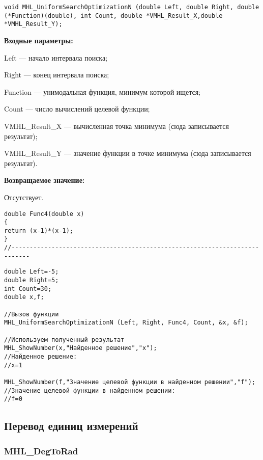 \documentclass[a4paper,12pt]{article}
\begin{document}
\begin{lstlisting}[label=code_syntax_MHL_UniformSearchOptimizationN,caption=Синтаксис]
void MHL_UniformSearchOptimizationN (double Left, double Right, double (*Function)(double), int Count, double *VMHL_Result_X,double *VMHL_Result_Y);
\end{lstlisting}

\textbf{Входные параметры:}

 Left --- начало интервала поиска;
 
Right --- конец интервала поиска;
 
Function --- унимодальная функция, минимум которой ищется;
 
Count --- число вычислений целевой функции;
 
VMHL\_Result\_X --- вычисленная точка минимума (сюда записывается результат);
 
VMHL\_Result\_Y --- значение функции в точке минимума (сюда записывается результат).

\textbf{Возвращаемое значение:}
 
 Отсутствует.

\begin{lstlisting}[caption=Оптимизируемая функция]
double Func4(double x)
{
return (x-1)*(x-1);
}
//---------------------------------------------------------------------------
\end{lstlisting}


\begin{lstlisting}[label=code_use_MHL_UniformSearchOptimizationN,caption=Пример использования]
double Left=-5;
double Right=5;
int Count=30;
double x,f;

//Вызов функции
MHL_UniformSearchOptimizationN (Left, Right, Func4, Count, &x, &f);

//Используем полученный результат
MHL_ShowNumber(x,"Найденное решение","x");
//Найденное решение:
//x=1

MHL_ShowNumber(f,"Значение целевой функции в найденном решении","f");
//Значение целевой функции в найденном решении:
//f=0
\end{lstlisting}

\subsection{Перевод единиц измерений}

\subsubsection{MHL\_DegToRad}\label{MHL_DegToRad}
\end{document}
